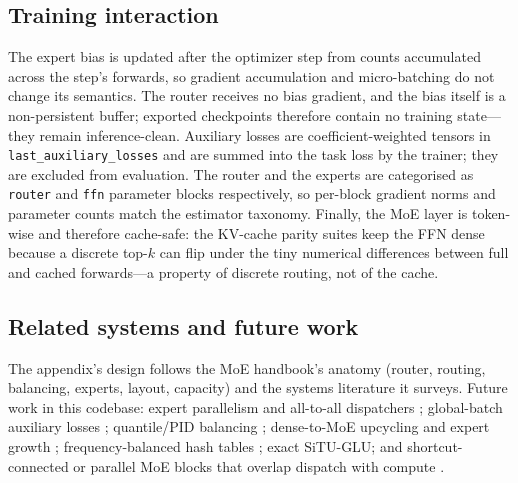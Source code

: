 \subsection{Training interaction}
\label{app:moe-training}

The expert bias is updated after the optimizer step from counts accumulated
across the step's forwards, so gradient accumulation and micro-batching do
not change its semantics. The router receives no bias gradient, and the bias
itself is a non-persistent buffer; exported checkpoints therefore contain no
training state---they remain inference-clean. Auxiliary losses are
coefficient-weighted tensors in \texttt{last\_auxiliary\_losses} and are
summed into the task loss by the trainer; they are excluded from
evaluation. The router and the experts are categorised as \texttt{router}
and \texttt{ffn} parameter blocks respectively, so per-block gradient norms
and parameter counts match the estimator taxonomy. Finally, the MoE layer is
token-wise and therefore cache-safe: the KV-cache parity suites keep the FFN
dense because a discrete top-$k$ can flip under the tiny numerical
differences between full and cached forwards---a property of discrete
routing, not of the cache.

\subsection{Related systems and future work}
\label{app:moe-future}

The appendix's design follows the MoE handbook's anatomy (router, routing,
balancing, experts, layout, capacity) and the systems literature it surveys.
Future work in this codebase: expert parallelism and all-to-all dispatchers
\citep{lepikhin2020gshard,fedus2021switch}; global-batch auxiliary losses
\citep{qiu2025demons}; quantile/PID balancing \citep{jin2026idbalancing};
dense-to-MoE upcycling and expert growth \citep{komatsuzaki2023upcycling};
frequency-balanced hash tables \citep{roller2021hash}; exact SiTU-GLU; and
shortcut-connected or parallel MoE blocks that overlap dispatch with compute
\citep{cai2024scmoe,longcat2025flash}.
